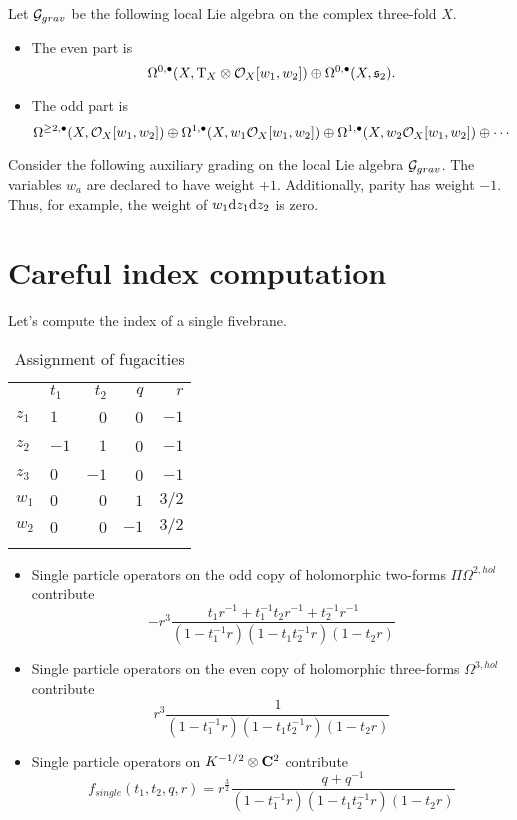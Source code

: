 \documentclass[11pt]{amsart}
\begin{document}
\begin{dfn}
Let $\mathcal G_{grav}$ be the following local Lie algebra on the complex three-fold $X$. 
\begin{itemize}
\item The even part is 
\[
\Omega^{0,\bullet}(X , {\rm T}_X \otimes \mathcal O_X [w_1,w_2]) \oplus \Omega^{0,\bullet}(X , \mathfrak{s}_2) .
\]
\item The odd part is 
\[
\Omega^{\geq 2, \bullet}(X, \mathcal O_X[w_1,w_2]) \oplus \Omega^{1,\bullet}(X, w_1 \mathcal O_X[w_1,w_2]) \oplus \Omega^{1,\bullet}(X, w_2 \mathcal O_X[w_1,w_2]) \oplus \cdots
\]
\end{itemize} 
\end{dfn}

\parsec

Consider the following auxiliary grading on the local Lie algebra $\mathcal G_{grav}$. 
The variables $w_a$ are declared to have weight $+1$. 
Additionally, parity has weight $-1$.
Thus, for example, the weight of $w_1 {\rm d} z_1 {\rm d} z_2$ is zero.

\section{Careful index computation}

Let's compute the index of a single fivebrane. 

\begin{table}[htbp]
\centering
\begin{tabular}{llrrr}
 & $t_1$ & $t_2$ & $q$ & $r$ \\
$z_1$ & $1$ & 0 & 0 & $-1$\\
$z_2$ & $-1$ & $1$ & 0 & $-1$\\
$z_3$ & $0$ & $-1$ & 0 & $-1$\\
$w_1$ & $0$ & $0$ & $1$ & $3/2$\\
$w_2$ & 0& 0 & $-1$ & $3/2$ \\
\\
\end{tabular}
\caption{Assignment of fugacities}
\end{table}

\begin{itemize}
\item Single particle operators on the odd copy of holomorphic two-forms $\Pi \Omega^{2,hol}$ contribute
\[
- r^3 \frac{t_1 r^{-1} + t_1^{-1} t_2 r^{-1} + t_2^{-1} r^{-1} }{(1-t_1^{-1}r) (1-t_1 t_2^{-1} r) (1-t_2 r)} 
\]
\item Single particle operators on the even copy of holomorphic three-forms $\Omega^{3,hol}$ contribute
\[
r^3 \frac{1}{(1-t_1^{-1}r) (1-t_1 t_2^{-1} r) (1-t_2 r)} 
\]
\item Single particle operators on $K^{-1/2} \otimes \mathbf{C}^2$ contribute
\[
f_{single} (t_1,t_2,q,r) = r^{\frac32} \frac{q + q^{-1}}{(1-t_1^{-1}r) (1-t_1 t_2^{-1} r) (1-t_2 r)}
\]
\end{itemize}
\end{document}
